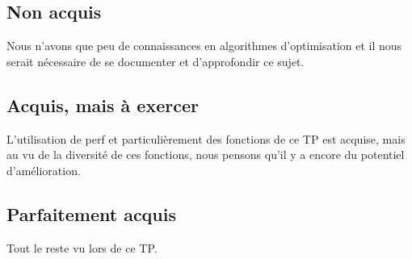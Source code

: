 \documentclass{ReportTemplate}
\begin{document}
\subsection{Non acquis}
Nous n'avons que peu de connaissances en algorithmes d'optimisation et il nous
serait nécessaire de se documenter et d'approfondir ce sujet.
\subsection{Acquis, mais à exercer}
L'utilisation de perf et particulièrement des fonctions de ce TP est acquise,
mais au vu de la diversité de ces fonctions, nous pensons qu'il y a encore du
potentiel d'amélioration.
\subsection{Parfaitement acquis}
Tout le reste vu lors de ce TP.
\end{document}

